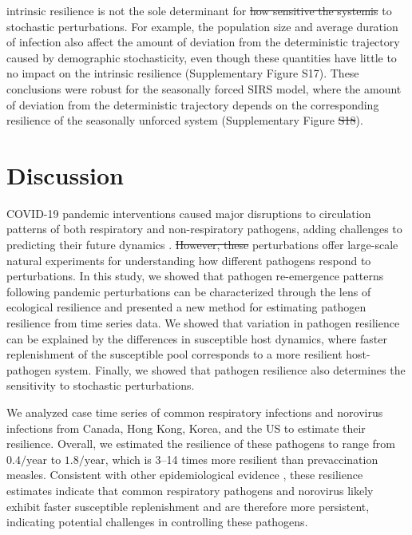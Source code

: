 \documentclass[12pt]{article}
\providecommand{\DIFaddtex}[1]{{\protect\color{blue}\uwave{#1}}} %
\providecommand{\DIFdeltex}[1]{{\protect\color{red}\sout{#1}}}                      %
\providecommand{\DIFaddbegin}{} %
\providecommand{\DIFaddend}{} %
\providecommand{\DIFdelbegin}{} %
\providecommand{\DIFdelend}{} %
\providecommand{\DIFadd}[1]{\texorpdfstring{\DIFaddtex{#1}}{#1}} %
\providecommand{\DIFdel}[1]{\texorpdfstring{\DIFdeltex{#1}}{}} %
\newcommand{\DIFscaledelfig}{0.5}
\newlength{\DIFdelgraphicswidth} %
\newlength{\DIFdelgraphicsheight} %
\newcommand{\DIFaddincludegraphics}[2][]{{\color{blue}\fbox{\DIFOincludegraphics[#1]{#2}}}} %
\newcommand{\DIFdelincludegraphics}[2][]{%
\sbox{\DIFdelgraphicsbox}{\DIFOincludegraphics[#1]{#2}}%
\settoboxwidth{\DIFdelgraphicswidth}{\DIFdelgraphicsbox} %
\settoboxtotalheight{\DIFdelgraphicsheight}{\DIFdelgraphicsbox} %
\scalebox{\DIFscaledelfig}{%
\parbox[b]{\DIFdelgraphicswidth}{\usebox{\DIFdelgraphicsbox}\\[-\baselineskip] \rule{\DIFdelgraphicswidth}{0em}}\llap{\resizebox{\DIFdelgraphicswidth}{\DIFdelgraphicsheight}{%
\setlength{\unitlength}{\DIFdelgraphicswidth}%
\begin{picture}(1,1)%
\thicklines\linethickness{2pt} %
{\color[rgb]{1,0,0}\put(0,0){\framebox(1,1){}}}%
{\color[rgb]{1,0,0}\put(0,0){\line( 1,1){1}}}%
{\color[rgb]{1,0,0}\put(0,1){\line(1,-1){1}}}%
\end{picture}%
}\hspace*{3pt}}} %
} %
\DeclareRobustCommand{\DIFaddbegin}{\DIFOaddbegin \let\includegraphics\DIFaddincludegraphics} %
\DeclareRobustCommand{\DIFaddend}{\DIFOaddend \let\includegraphics\DIFOincludegraphics} %
\DeclareRobustCommand{\DIFdelbegin}{\DIFOdelbegin \let\includegraphics\DIFdelincludegraphics} %
\DeclareRobustCommand{\DIFdelend}{\DIFOaddend \let\includegraphics\DIFOincludegraphics} %
\begin{document}
\DIFadd{The }\DIFaddend intrinsic resilience is not the sole determinant for \DIFdelbegin \DIFdel{how sensitive the systemis }\DIFdelend \DIFaddbegin \DIFadd{of a system's sensitivity }\DIFaddend to stochastic perturbations.
For example, the population size and average duration of infection also affect the amount of deviation from the deterministic trajectory caused by demographic stochasticity, even though these quantities have little to no impact on the intrinsic resilience (Supplementary Figure S17).
These conclusions were robust for the seasonally forced SIRS model, where the amount of deviation from the deterministic trajectory depends on the corresponding resilience of the seasonally unforced system (Supplementary Figure \DIFdelbegin \DIFdel{S18}\DIFdelend \DIFaddbegin \DIFadd{S19}\DIFaddend ).

\section*{Discussion}

COVID-19 pandemic interventions caused major disruptions to circulation patterns of both respiratory and non-respiratory pathogens, adding challenges to predicting their future dynamics \citep{baker2020impact,gomez2021uncertain,koltai2022determinants,park2024predicting}.
\DIFdelbegin \DIFdel{However, these }\DIFdelend \DIFaddbegin \DIFadd{These }\DIFaddend perturbations offer large-scale natural experiments for understanding how different pathogens respond to perturbations.
In this study, we showed that pathogen re-emergence patterns following pandemic perturbations can be characterized through the lens of ecological resilience and presented a new method for estimating pathogen resilience from time series data.
We showed that variation in pathogen resilience can be explained by the differences in susceptible host dynamics, where faster replenishment of the susceptible pool corresponds to a more resilient host-pathogen system.
Finally, we showed that pathogen resilience also determines the sensitivity to stochastic perturbations.

We analyzed case time series of common respiratory infections and norovirus infections from Canada, Hong Kong, Korea, and the US to estimate their resilience.
Overall, we estimated the resilience of these pathogens to range from $0.4/\mathrm{year}$ to $1.8/\mathrm{year}$, which is 3--14 times more resilient than prevaccination measles.
Consistent with other epidemiological evidence \citep{bosis2008role,o2009symptomatic,pitzer2015environmental,edridge2020seasonal}, these resilience estimates indicate that common respiratory pathogens and norovirus likely exhibit faster susceptible replenishment and are therefore more persistent, indicating potential challenges in controlling these pathogens.
\end{document}
